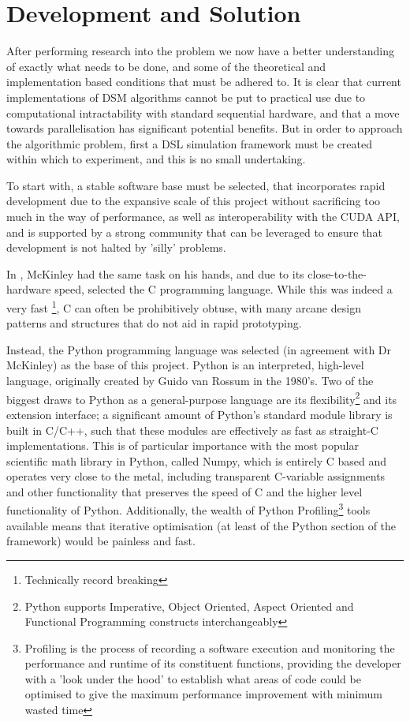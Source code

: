 \chapter{Development and Solution}
\label{sec:solution}

After performing research into the problem we now have a better understanding of exactly what needs to be done, and some of the theoretical and implementation based conditions that must be adhered to. It is clear that current implementations of DSM algorithms cannot be put to practical use due to computational intractability with standard sequential hardware, and that a move towards parallelisation has significant potential benefits. But in order to approach the algorithmic problem, first a DSL simulation framework must be created within which to experiment, and this is no small undertaking.

To start with, a stable software base must be selected, that incorporates rapid development due to the expansive scale of this project without sacrificing too much in the way of performance, as well as interoperability with the CUDA API, and is supported by a strong community that can be leveraged to ensure that development is not halted by 'silly' problems.

In \cite{AM09}, McKinley had the same task on his hands, and due to its close-to-the-hardware speed, selected the C programming language. While this was indeed a very fast \footnote{Technically record breaking}, C can often be prohibitively obtuse, with many arcane design patterns and structures that do not aid in rapid prototyping. 

Instead, the Python programming language was selected (in agreement with Dr McKinley) as the base of this project. Python is an interpreted, high-level language, originally created by Guido van Rossum in the 1980's. Two of the biggest draws to Python as a general-purpose language are its flexibility\footnote{Python supports Imperative, Object Oriented, Aspect Oriented and Functional Programming constructs interchangeably} and its extension interface; a significant amount of Python's standard module library is built in C/C++, such that these modules are effectively as fast as straight-C implementations. This is of particular importance with the most popular scientific math library in Python, called Numpy, which is entirely C based and operates very close to the metal, including transparent C-variable assignments and other functionality that preserves the speed of C and the higher level functionality of Python. Additionally, the wealth of Python Profiling\footnote{Profiling is the process of recording a software execution and monitoring the performance and runtime of its constituent functions, providing the developer with a 'look under the hood' to establish what areas of code could be optimised to give the maximum performance improvement with minimum wasted time} tools available means that iterative optimisation (at least of the Python section of the framework) would be painless and fast.

